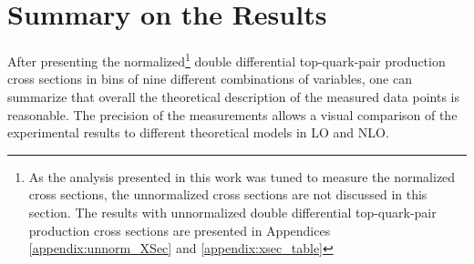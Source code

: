 %  
% 
% 
% 

\section{Summary on the Results}

After presenting the normalized\footnote{As the analysis presented in this work was tuned to measure the normalized cross sections, the unnormalized cross sections are not
discussed in this section. The results with unnormalized double differential top-quark-pair production cross sections are presented in Appendices \ref{appendix:unnorm_XSec}
and \ref{appendix:xsec_table}} double differential top-quark-pair production cross sections in bins of nine different combinations of variables,
one can summarize that overall the theoretical description of the measured data points is reasonable. The precision of the measurements allows a visual 
comparison of the experimental results to different theoretical models in LO and NLO.

